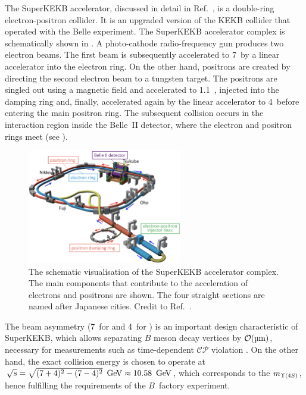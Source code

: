 The SuperKEKB accelerator, discussed in detail in Ref.~\cite{Akai:2018mbz}, is a double-ring electron-positron collider.
It is an upgraded version of the KEKB collider \cite{Oide:2009zz} that operated with the Belle experiment.
The SuperKEKB accelerator complex is schematically shown in .
A photo-cathode radio-frequency gun produces two electron beams.
The first beam is subsequently accelerated to 7~\gev by a linear accelerator into the electron ring.
On the other hand, positrons are created by directing the second electron beam to a tungsten target.
The positrons are singled out using a magnetic field and accelerated to 1.1~\gev, injected into the damping ring and, finally,
accelerated again by the linear accelerator to 4~\gev before entering the main positron ring.
The subsequent collision occurs in the interaction region inside the Belle~II detector, where the electron and positron rings meet (see ).
\begin{figure}[hbtp!]
    \centering
    \includegraphics[width=0.6\textwidth]{figures/experimental_setup/super_kekb.png}
    \caption{\label{fig:superkekb}
        The schematic visualisation of the SuperKEKB accelerator complex.
        The main components that contribute to the acceleration of electrons and positrons are shown.
        The four straight sections are named after Japanese cities.
        Credit to Ref.~\cite{Akai:2018mbz}.
    }
\end{figure}

The beam asymmetry (7~\gev for \en and 4~\gev for \ep) is an important design characteristic of SuperKEKB, 
which allows separating $B$ meson decay vertices by ${\cal O}(\si{\micro\meter})$, necessary for measurements such as time-dependent $\mathcal{CP}$ violation \cite{BaBar:2014omp}.
On the other hand, the exact collision energy is chosen to operate at $\sqrt{s}=\sqrt{(7+4)^2-(7-4)^2}~\mathrm{\,Ge\kern -0.1em V}\approx10.58~\mathrm{\,Ge\kern -0.1em V}$, which corresponds to the $m_{\FourS}$, 
hence fulfilling the requirements of the $B$~factory experiment.

